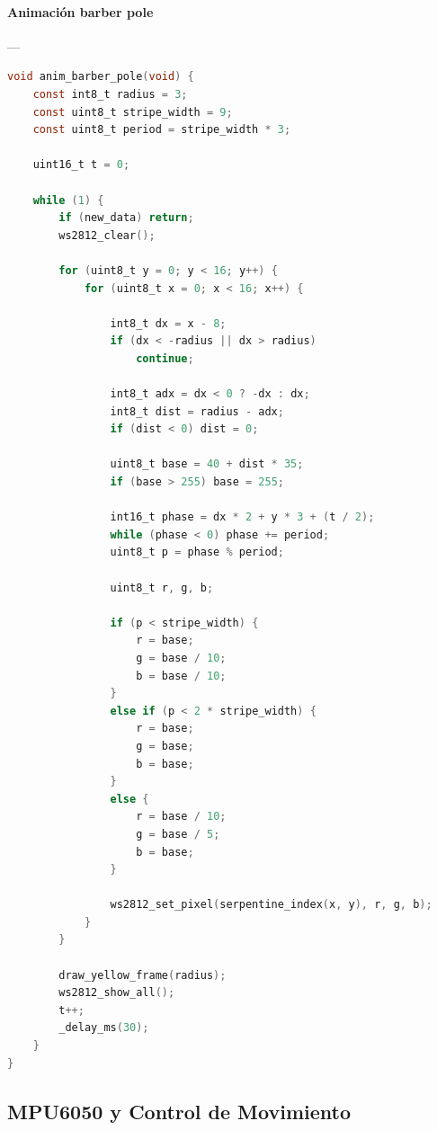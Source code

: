 \paragraph{Animación barber pole}\label{anexo:WSbarber}---\\
\begin{lstlisting}[language=C, caption={Animacion tipo Barber Pole}]
void anim_barber_pole(void) {
    const int8_t radius = 3;
    const uint8_t stripe_width = 9;
    const uint8_t period = stripe_width * 3;

    uint16_t t = 0;

    while (1) {
        if (new_data) return;
        ws2812_clear();

        for (uint8_t y = 0; y < 16; y++) {
            for (uint8_t x = 0; x < 16; x++) {

                int8_t dx = x - 8;
                if (dx < -radius || dx > radius)
                    continue;

                int8_t adx = dx < 0 ? -dx : dx;
                int8_t dist = radius - adx;
                if (dist < 0) dist = 0;

                uint8_t base = 40 + dist * 35;
                if (base > 255) base = 255;

                int16_t phase = dx * 2 + y * 3 + (t / 2);
                while (phase < 0) phase += period;
                uint8_t p = phase % period;

                uint8_t r, g, b;

                if (p < stripe_width) {
                    r = base;
                    g = base / 10;
                    b = base / 10;
                }
                else if (p < 2 * stripe_width) {
                    r = base;
                    g = base;
                    b = base;
                }
                else {
                    r = base / 10;
                    g = base / 5;
                    b = base;
                }

                ws2812_set_pixel(serpentine_index(x, y), r, g, b);
            }
        }

        draw_yellow_frame(radius);
        ws2812_show_all();
        t++;
        _delay_ms(30);
    }
}
\end{lstlisting}








\subsection{\textbf{MPU6050 y Control de Movimiento}}

